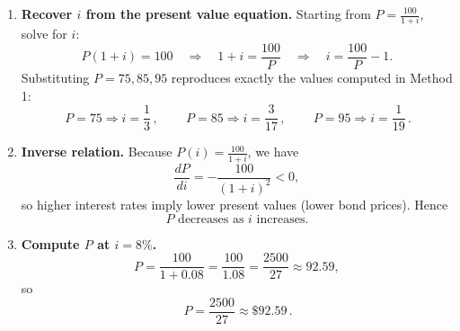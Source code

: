 \documentclass[12pt]{article}
\begin{document}
\begin{enumerate}[label=(\alph*)]
\item \textbf{Recover \(i\) from the present value equation.}
Starting from \(P=\frac{100}{1+i}\), solve for \(i\):
\[
P(1+i)=100
\quad\Longrightarrow\quad
1+i=\frac{100}{P}
\quad\Longrightarrow\quad
i=\frac{100}{P}-1.
\]
Substituting \(P=75,85,95\) reproduces exactly the values computed in Method 1:
\[
\boxed{\,P=75\Rightarrow i=\frac{1}{3}\,},\qquad
\boxed{\,P=85\Rightarrow i=\frac{3}{17}\,},\qquad
\boxed{\,P=95\Rightarrow i=\frac{1}{19}\,}.
\]

\item \textbf{Inverse relation.}
Because \(P(i)=\frac{100}{1+i}\), we have
\[
\frac{dP}{di}=-\frac{100}{(1+i)^2}<0,
\]
so higher interest rates imply lower present values (lower bond prices). Hence
\[
\boxed{\,P \text{ decreases as } i \text{ increases.}\,}
\]

\item \textbf{Compute \(P\) at \(i=8\%\).}
\[
P=\frac{100}{1+0.08}=\frac{100}{1.08}=\frac{2500}{27}\approx 92.59,
\]
so
\[
\boxed{\,P=\frac{2500}{27}\approx \$92.59\, }.
\]
\end{enumerate}
\end{document}
